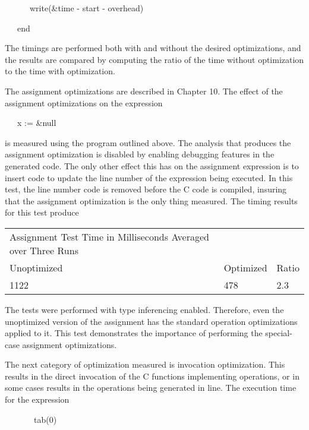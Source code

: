 {\ttfamily\mdseries
\ \ \ \ \ \ write(\&time - start - overhead)}

{\ttfamily\mdseries
\ \ \ end}

The timings are performed both with and without the desired
optimizations, and the results are compared by computing the ratio of
the time without optimization to the time with optimization.

The assignment optimizations are described in Chapter 10. The effect
of the assignment optimizations on the expression

{\ttfamily\mdseries
\ \ \ x := \&null}

\noindent is measured using the program outlined above. The analysis
that produces the assignment optimization is disabled by enabling
debugging features in the generated code. The only other effect this
has on the assignment expression is to insert code to update the line
number of the expression being executed. In this test, the line number
code is removed before the C code is compiled, insuring that the
assignment optimization is the only thing measured. The timing results
for this test produce

\begin{center}
\tablefirsthead{}
\tablehead{}
\tabletail{}
\tablelasttail{}
\begin{supertabular}{m{3.32686in}m{0.69905984in}m{0.35315984in}}
 Assignment Test\newline
Time in Milliseconds Averaged over Three Runs &
~
 &
~
\\
 Unoptimized &
 Optimized &
 Ratio\\
 1122  &
 478  &
 2.3 \\
\end{supertabular}
\end{center}

The tests were performed with type inferencing enabled. Therefore,
even the {\textquotedbl}unoptimized{\textquotedbl} version of the
assignment has the standard operation optimizations applied to
it. This test demonstrates the importance of performing the
special-case assignment optimizations.

The next category of optimization measured is invocation
optimization. This results in the direct invocation of the C functions
implementing operations, or in some cases results in the operations
being generated in line. The execution time for the expression

{\ttfamily\mdseries
\ \ \ \ \ \ \ tab(0)}

